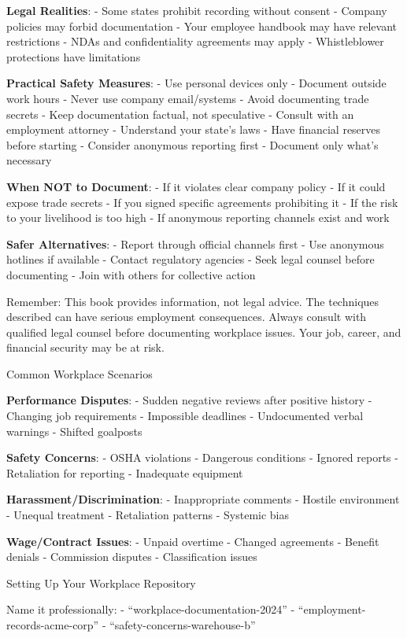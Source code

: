 \textbf{Legal Realities}: - Some states prohibit recording without
consent - Company policies may forbid documentation - Your employee
handbook may have relevant restrictions - NDAs and confidentiality
agreements may apply - Whistleblower protections have limitations

\textbf{Practical Safety Measures}: - Use personal devices only -
Document outside work hours - Never use company email/systems - Avoid
documenting trade secrets - Keep documentation factual, not speculative
- Consult with an employment attorney - Understand your state's laws -
Have financial reserves before starting - Consider anonymous reporting
first - Document only what's necessary

\textbf{When NOT to Document}: - If it violates clear company policy -
If it could expose trade secrets - If you signed specific agreements
prohibiting it - If the risk to your livelihood is too high - If
anonymous reporting channels exist and work

\textbf{Safer Alternatives}: - Report through official channels first -
Use anonymous hotlines if available - Contact regulatory agencies - Seek
legal counsel before documenting - Join with others for collective
action

Remember: This book provides information, not legal advice. The
techniques described can have serious employment consequences. Always
consult with qualified legal counsel before documenting workplace
issues. Your job, career, and financial security may be at risk.

Common Workplace Scenarios

\textbf{Performance Disputes}: - Sudden negative reviews after positive
history - Changing job requirements - Impossible deadlines -
Undocumented verbal warnings - Shifted goalposts

\textbf{Safety Concerns}: - OSHA violations - Dangerous conditions -
Ignored reports - Retaliation for reporting - Inadequate equipment

\textbf{Harassment/Discrimination}: - Inappropriate comments - Hostile
environment - Unequal treatment - Retaliation patterns - Systemic bias

\textbf{Wage/Contract Issues}: - Unpaid overtime - Changed agreements -
Benefit denials - Commission disputes - Classification issues

Setting Up Your Workplace Repository

Name it professionally: - ``workplace-documentation-2024'' -
``employment-records-acme-corp'' - ``safety-concerns-warehouse-b''

